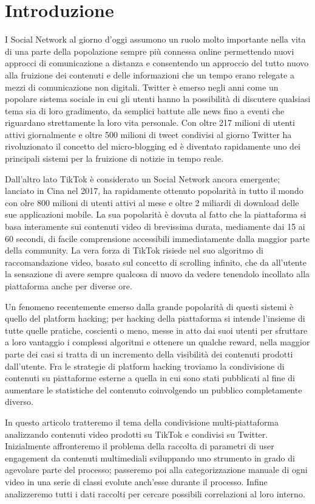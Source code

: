\section{Introduzione}

I Social Network al giorno d'oggi assumono un ruolo molto importante nella vita di una parte della popolazione sempre più connessa 
online permettendo nuovi approcci di comunicazione a distanza e consentendo un approccio del tutto nuovo alla fruizione dei 
contenuti e delle informazioni che un tempo erano relegate a mezzi di comunicazione non digitali. Twitter 
è emerso negli anni come un popolare sistema sociale in cui gli utenti hanno la possibilità di discutere qualsiasi tema sia di 
loro gradimento, da semplici battute alle news fino a eventi che riguardano strettamente la loro vita personale\cite{benevenuto2010detecting}. 
Con oltre 217 milioni di utenti attivi giornalmente e oltre 500 milioni di tweet condivisi al giorno Twitter ha rivoluzionato 
il concetto del micro-blogging ed è diventato rapidamente uno dei principali sistemi per la fruizione di notizie in tempo reale. 

Dall'altro lato TikTok è considerato un Social Network ancora emergente; lanciato in Cina nel 2017, ha rapidamente ottenuto 
popolarità in tutto il mondo con olre 800 milioni di utenti attivi al mese e oltre 2 miliardi di download delle sue applicazioni 
mobile\cite{li2021communicating}.
La sua popolarità è dovuta al fatto che la piattaforma si basa interamente sui contenuti video di brevissima durata, mediamente 
dai 15 ai 60 secondi, di facile comprensione accessibili immediatamente dalla maggior parte della community. 
La vera forza di TikTok risiede nel suo algoritmo di raccomandazione video, basato sul concetto di scrolling infinito, che da all'utente 
la sensazione di avere sempre qualcosa di nuovo da vedere tenendolo incollato alla piattaforma anche per diverse ore.

Un fenomeno recentemente emerso dalla grande popolarità di questi sistemi è quello del platform hacking; per hacking della piattaforma 
si intende l'insieme di tutte quelle pratiche, coscienti o meno, messe in atto dai suoi utenti per sfruttare a loro vantaggio i complessi 
algoritmi e ottenere un qualche reward, nella maggior parte dei casi si tratta di un incremento della visibilità dei contenuti prodotti 
dall'utente. 
Fra le strategie di platform hacking troviamo la condivisione di contenuti su piattaforme esterne a quella in cui sono stati pubblicati 
al fine di aumentare le statistiche del contenuto coinvolgendo un pubblico completamente diverso.

In questo articolo tratteremo il tema della condivisione multi-piattaforma analizzando contenuti video prodotti su TikTok e condivisi 
su Twitter.
Inizialmente affronteremo il problema della raccolta di parametri di user engagement da contenuti multimediali sviluppando 
uno strumento in grado di agevolare parte del processo; passeremo poi alla categorizzazione manuale di ogni video in una serie di 
classi evolute anch'esse durante il processo. Infine analizzeremo tutti i dati raccolti per cercare possibili correlazioni al loro 
interno.
